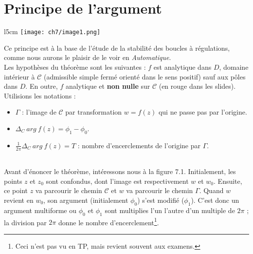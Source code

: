 \section{Principe de l'argument}
\begin{wrapfigure}[8]{l}{5cm}
	\texttt{[image: ch7/image1.png]}
\end{wrapfigure}
Ce principe est à la base de l'étude de la stabilité des boucles à régulations, comme 
nous aurons le plaisir de le voir en \textit{Automatique}.\\
Les hypothèses du théorème sont les suivantes : $f$ est analytique dans $D$, domaine
intérieur à $\mathcal{C}$ (admissible simple fermé orienté dans le sens positif) sauf 
aux pôles dans $D$. En outre, $f$ analytique et \textbf{non nulle} sur $\mathcal{C}$
(en rouge dans les slides).\\
Utilisions les notations  :\ \\
\begin{itemize}
	\item $\Gamma$ : l'image de $\mathcal{C}$ par transformation $w=f(z)$ qui ne passe pas
	      par l'origine.
	\item $\Delta_C\ arg\ f(z) = \phi_1-\phi_0$.
	\item $\frac{1}{2\pi}\Delta_C\ arg\ f(z) = T$ : nombre d'encerclements de l'origine par
	      $\Gamma$.
\end{itemize}\ \\
Avant d'énoncer le théorème, intéressons nous à la figure 7.1. Initialement, les points
$z$ et $z_0$ sont confondus, dont l'image est respectivement $w$ et $w_0$. Ensuite, 
ce point $z$ va parcourir le chemin $\mathcal{C}$ et $w$ va parcourir le chemin $\Gamma$. 
Quand $w$ revient en $w_0$, son argument (initialement $\phi_0$) s'est modifié ($\phi_1$). 
C'est donc un argument multiforme ou $\phi_0$ et $\phi_1$ sont multiplies l'un l'autre 
d'un multiple de $2\pi$ ; la division par $2\pi$ donne le nombre  d'encerclement\footnote{
	Ceci n'est pas vu en TP, mais revient souvent aux examens.}.\\



